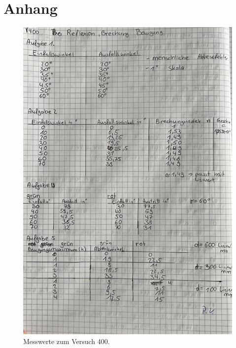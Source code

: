 \section{Anhang}
\label{sec:Anhang}
\begin{figure}[H]
   \centering
    \includegraphics[scale=0.45]{build/KladdeS1.jpeg}
    \caption{Messwerte zum Versuch 400.}
\end{figure}
\pagebreak